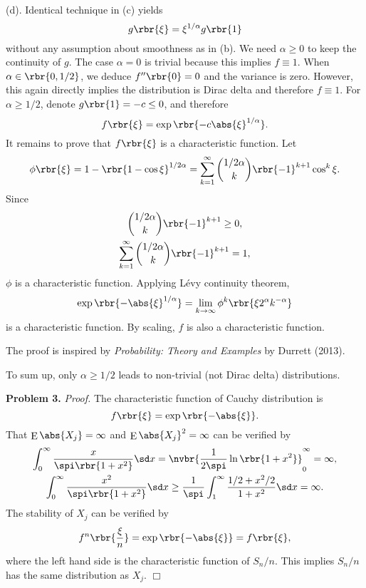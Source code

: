 \documentclass[english, nochinese]{pnote}
\DeclareMathOperator\ope{\mathrm{E}}
\begin{document}
(d). Identical technique in (c) yields
\begin{equation}
g \rbr{\xi} = \xi^{ 1 / \alpha } g \rbr{1}
\end{equation}
without any assumption about smoothness as in (b). We need $ \alpha \ge 0 $ to keep the continuity of $g$. The case $ \alpha = 0 $ is trivial because this implies $ f \equiv 1 $. When $ \alpha \in \rbr{ 0, 1 / 2 } $, we deduce $ f'' \rbr{0} = 0 $ and the variance is zero. However, this again directly implies the distribution is Dirac delta and therefore $ f \equiv 1 $. For $ \alpha \ge 1 / 2 $, denote $ g \rbr{1} = -c \le 0 $, and therefore
\begin{equation}
f \rbr{\xi} = \exp \rbr{ -c \abs{\xi}^{ 1 / \alpha } }.
\end{equation}
It remains to prove that $ f \rbr{\xi} $ is a characteristic function. Let
\begin{equation}
\phi \rbr{\xi} = 1 - \rbr{ 1 - \cos \xi }^{ 1 / 2 \alpha } = \sum_{ k = 1 }^{\infty} \binom{ 1 / 2 \alpha }{k} \rbr{-1}^{ k + 1 } \cos^k \xi.
\end{equation}
Since
\begin{gather}
\binom{ 1 / 2 \alpha }{k} \rbr{-1}^{ k + 1 } \ge 0, \\
\sum_{ k = 1 }^{\infty} \binom{ 1 / 2 \alpha }{k} \rbr{-1}^{ k + 1 } = 1,
\end{gather}
$\phi$ is a characteristic function. Applying L\'evy continuity theorem,
\begin{equation}
\exp \rbr{-\abs{\xi}^{ 1 / \alpha }} = \lim_{ k \rightarrow \infty }{ \phi^k \rbr{ \xi 2^{\alpha} k^{-\alpha} } }
\end{equation}
is a characteristic function. By scaling, $f$ is also a characteristic function.

The proof is inspired by \emph{Probability: Theory and Examples} by Durrett (2013).

To sum up, only $ \alpha \ge 1 / 2 $ leads to non-trivial (not Dirac delta) distributions.

\textbf{Problem 3.} \textit{Proof.} The characteristic function of Cauchy distribution is
\begin{equation}
f \rbr{\xi} = \exp \rbr{-\abs{\xi}}.
\end{equation}
That $ \ope \abs{X_j} = \infty $ and $ \ope \abs{X_j}^2 = \infty $ can be verified by
\begin{gather}
\int_0^{\infty} \frac{x}{ \spi \rbr{ 1 + x^2 } } \sd x = \nvbr{ \frac{1}{ 2 \spi } \ln \rbr{ 1 + x^2 } }_0^{\infty} = \infty, \\
\int_0^{\infty} \frac{x^2}{ \spi \rbr{ 1 + x^2 } } \sd x \ge \frac{1}{\spi} \int_1^{\infty} \frac{ 1 / 2 + x^2 / 2 }{ 1 + x^2 } \sd x = \infty.
\end{gather}
The stability of $X_j$ can be verified by
\begin{equation}
f^n \rbr{\frac{\xi}{n}} = \exp \rbr{ -\abs{\xi} } = f \rbr{ \xi },
\end{equation}
where the left hand side is the characteristic function of $ S_n / n $. This implies $ S_n / n $ has the same distribution as $X_j$.
\hfill$\Box$
\end{document}

